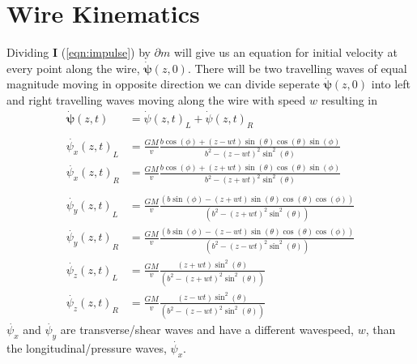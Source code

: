 \documentclass{report}
\begin{document}
\section*{Wire Kinematics}
Dividing $\mathbf{I}$ (\ref{eqn:impulse}) by $\partial m$ will give us an equation for initial velocity at every point along the wire, $\mathbf{\dot\psi} (z, 0)$. 
There will be two travelling waves of equal magnitude moving in opposite direction we can divide seperate $\mathbf{\dot\psi}(z,0)$ into left and right travelling waves moving along the wire with speed $w$ resulting in
\begin{align}
    \mathbf{\dot{\psi}} (z, t) &= {\dot{\psi} (z, t)}_L + {\dot{\psi} (z, t)}_R \label{eqn:velocity pulse}\\
    \nonumber\\
    \nonumber {\dot{\psi_x} (z, t)}_L &= \frac{G M}{v} \frac{b \cos (\phi )+ (z - w t) \sin (\theta ) \cos (\theta ) \sin (\phi )}{b^2-{(z - w t)}^2 \sin ^2(\theta )}\\
    \nonumber {\dot{\psi_x} (z, t)}_R &= \frac{G M}{v} \frac{b \cos (\phi )+ (z + w t) \sin (\theta ) \cos (\theta ) \sin (\phi )}{b^2-{(z + w t)}^2 \sin ^2(\theta )}\\
    \nonumber\\
    \nonumber {\dot{\psi_y} (z, t)}_L &= \frac{G M}{v} \frac{(b \sin (\phi )-{(z + w t)} \sin (\theta ) \cos (\theta ) \cos (\phi ))}{\left(b^2-{(z + w t)}^2 \sin ^2(\theta )\right)}\\
    \nonumber {\dot{\psi_y} (z, t)}_R &= \frac{G M}{v} \frac{(b \sin (\phi )-{(z - w t)} \sin (\theta ) \cos (\theta ) \cos (\phi ))}{\left(b^2-{(z - w t)}^2 \sin ^2(\theta )\right)}
    \nonumber\\
    \nonumber {\dot{\psi_z} (z, t)}_L &= \frac{G M}{v} \frac{{(z + w t)} \sin ^2(\theta )}{\left(b^2-{(z + w t)}^2 \sin ^2(\theta )\right)}\\
    \nonumber {\dot{\psi_z} (z, t)}_R &= \frac{G M}{v} \frac{{(z - w t)} \sin ^2(\theta )}{\left(b^2-{(z - w t)}^2 \sin ^2(\theta )\right)}
\end{align}
$\dot{\psi_x}$ and $\dot{\psi_y}$ are transverse/shear waves and have a different wavespeed, $w$, than the longitudinal/pressure waves, $\dot{\psi_x}$.
\end{document}
